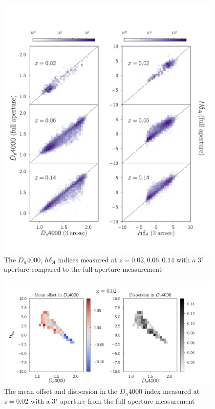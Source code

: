 \begin{figure}
\includegraphics[width=\textwidth]{figures/full_aperture_comparisons.pdf}
\caption[Short figure name.]{ The $D_{n}4000$, $h\delta_{A}$ indices measured at $z = 0.02,0.06,0.14$ with a $3$" aperture compared to the full aperture measurement
\label{fig:myInlineFigure}}
\end{figure}

\begin{figure}
\includegraphics[width=\textwidth]{figures/zb.pdf}
\caption[Short figure name.]{ The mean offset and dispersion in the $D_{n}4000$ index measured at $z = 0.02$ with a $3$" aperture from the full aperture measurement
\label{fig:myInlineFigure}}
\end{figure}

